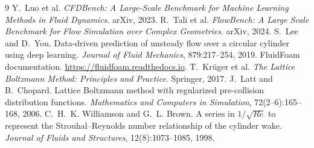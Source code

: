 \documentclass[11pt,a4paper]{article}
\begin{document}
\newpage
\begin{thebibliography}{9}
 Y.~Luo et al. \emph{CFDBench: A Large-Scale Benchmark for Machine Learning Methods in Fluid Dynamics}. arXiv, 2023.
 R.~Tali et al. \emph{FlowBench: A Large Scale Benchmark for Flow Simulation over Complex Geometries}. arXiv, 2024.
 S.~Lee and D.~You. Data-driven prediction of unsteady flow over a circular cylinder using deep learning. \emph{Journal of Fluid Mechanics}, 879:217--254, 2019.
 FluidFoam documentation. \url{https://fluidfoam.readthedocs.io}.
 T.~Kr\"uger et al. \emph{The Lattice Boltzmann Method: Principles and Practice}. Springer, 2017.
 J.~Latt and B.~Chopard. Lattice Boltzmann method with regularized pre-collision distribution functions. \emph{Mathematics and Computers in Simulation}, 72(2--6):165--168, 2006.
 C.~H.~K. Williamson and G.~L. Brown. A series in $1/\sqrt{Re}$ to represent the Strouhal--Reynolds number relationship of the cylinder wake. \emph{Journal of Fluids and Structures}, 12(8):1073--1085, 1998.
\end{thebibliography}
\end{document}
